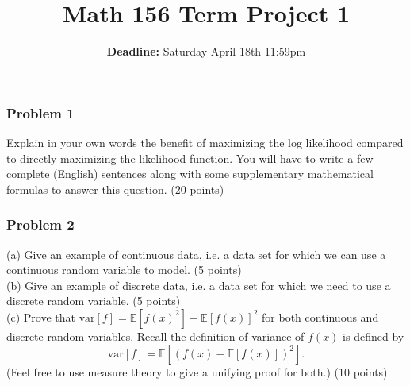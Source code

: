 \documentclass[12pt,a4paper]{article}
\newcommand{\var}{\mbox{var}}
\newcommand{\E}{\mathbb{E}}
\begin{document}
\title{Math 156 Term Project 1}
\author{\textbf{Deadline:} Saturday April 18th 11:59pm}
\date{}
\maketitle

\subsubsection*{Problem 1}
Explain in your own words the benefit of maximizing the log likelihood compared to directly maximizing the likelihood function. You will have to write a few complete (English) sentences along with some supplementary mathematical formulas to answer this question. (20 points)

\subsubsection*{Problem 2}
(a) Give an example of continuous data, i.e. a data set for which we can use a continuous random variable to model. (5 points) \\
(b) Give an example of discrete data, i.e. a data set for which we need to use a discrete random variable. (5 points) \\
(c) Prove that $\var[f] = \mathbb E[f(x)^2] - \mathbb E[f(x)]^2$ for both continuous and discrete random variables. Recall the definition of variance of $f(x)$ is defined by
\begin{equation*}
\var[f] = \E[ (f(x) - \E[f(x)])^2 ].
\end{equation*}
(Feel free to use measure theory to give a unifying proof for both.) (10 points)
\end{document}
